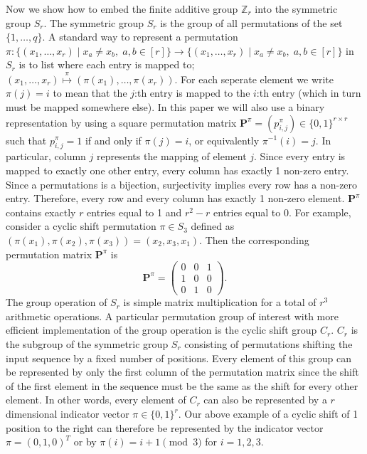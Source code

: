 Now we show how to embed the finite additive group $\mathbb{Z}_r$ into the symmetric group $S_r$. The symmetric group $S_r$ is the group of all permutations of the set $\{1, \dots, q\}$. A standard way to represent a permutation $\pi \colon \{(x_1, \dots, x_r) \mid x_a \neq x_b, \; a,b \in [r]\} \to \{(x_1, \dots, x_r) \mid x_a \neq x_b, \; a,b \in [r]\}$ in $S_r$ is to list where each entry is mapped to; $(x_1,\dots,x_r) \stackrel{\pi}{\mapsto} (\pi(x_1), \dots, \pi(x_r))$. For each seperate element we write $\pi(j) = i$ to mean that the $j$:th entry is mapped to the $i$:th entry (which in turn must be mapped somewhere else). In this paper we will also use a binary representation by using a square permutation matrix $\mathbf{P}^{\pi} = (p^{\pi}_{i,j}) \in \{0,1\}^{r \times r}$ such that $p^{\pi}_{i, j} = 1$ if and only if $\pi(j) = i$, or equivalently $\pi^{-1}(i) = j$. In particular, column $j$ represents the mapping of element $j$. Since every entry is mapped to exactly one other entry, every column has exactly 1 non-zero entry. Since a permutations is a bijection, surjectivity implies every row has a non-zero entry. Therefore, every row and every column has exactly 1 non-zero element. $\mathbf{P}^{\pi}$ contains exactly $r$ entries equal to 1 and $r^2 - r$ entries equal to 0. For example, consider a cyclic shift permutation $\pi \in S_3$ defined as $(\pi(x_1),\pi(x_2),\pi(x_3))=(x_2,x_3,x_1)$. Then the corresponding permutation matrix $\mathbf{P}^{\pi}$ is
\begin{equation*}
    \mathbf{P}^{\pi} = \begin{pmatrix}
        0 & 0 & 1 \\
        1 & 0 & 0 \\
        0 & 1 & 0
    \end{pmatrix}.
\end{equation*}
The group operation of $S_r$ is simple matrix multiplication for a total of $r^3$ arithmetic operations. A particular permutation group of interest with more efficient implementation of the group operation is the cyclic shift group $C_r$. $C_r$ is the subgroup of the symmetric group $S_r$ consisting of permutations shifting the input sequence by a fixed number of positions. Every element of this group can be represented by only the first column of the permutation matrix since the shift of the first element in the sequence must be the same as the shift for every other element. In other words, every element of $C_r$ can also be represented by a $r$ dimensional indicator vector $\pi \in \{0,1\}^r$. Our above example of a cyclic shift of 1 position to the right can therefore be represented by the indicator vector $\pi = (0,1,0)^T$ or by $\pi(i) = i + 1 \pmod 3$ for $i = 1, 2, 3$. 
